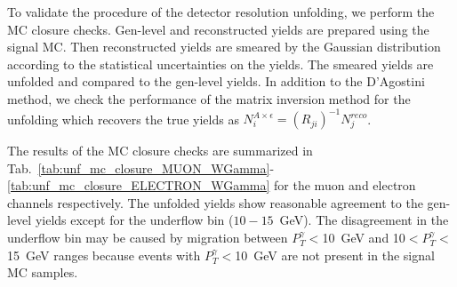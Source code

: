 To validate the procedure of the detector resolution unfolding, we perform the MC closure checks. Gen-level and reconstructed yields are prepared using the signal MC. Then reconstructed yields are smeared by the Gaussian distribution according to the statistical uncertainties on the yields. The smeared yields are unfolded and compared to the gen-level yields. In addition to the D'Agostini method, we check the performance of the matrix inversion method for the unfolding which recovers the true yields as $N^{A\times\epsilon}_i = (R_{ji})^{-1} N^{reco}_j$. 

The results of the MC closure checks are summarized in Tab.~\ref{tab:unf_mc_closure_MUON_WGamma}-\ref{tab:unf_mc_closure_ELECTRON_WGamma} for the muon and electron channels respectively. The unfolded yields show reasonable agreement to the gen-level yields except for the underflow bin ($10-15$~GeV). The disagreement in the underflow bin may be caused by migration between $P_T^{\gamma}<$10~GeV and 10$<P_T^{\gamma}<$15~GeV ranges because events with $P_T^{\gamma}<$10~GeV are not present in the signal MC samples.  



